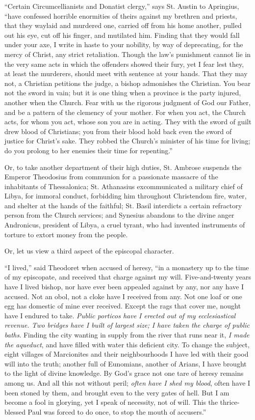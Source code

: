 ``Certain Circumcellianists and Donatist clergy,'' says St.
Austin to Apringius, ``have confessed horrible enormities of
theirs against my brethren and priests, that they waylaid and murdered
one, carried off from his home another, pulled out his eye, cut off
his finger, and mutilated him. Finding that they would fall under your
axe, I write in haste to your nobility, by way of deprecating, for the
mercy of Christ, any strict retaliation.
Though the law's punishment cannot lie in the very same acts in which
the offenders showed their fury, yet I fear lest they, at least the
murderers, should meet with sentence at your hands. That they may not,
a Christian petitions the judge, a bishop admonishes the Christian.
You bear not the sword in vain; but it is one thing when a province is
the party injured, another when the Church. Fear with us the rigorous
judgment of God our Father, and be a pattern of the clemency of your
mother. For when you act, the Church acts, for whom you act, whose son
you are in acting. They with the sword of guilt drew blood of
Christians; you from their blood hold back even the sword of justice
for Christ's sake. They robbed the Church's minister of his time for
living; do you prolong to her enemies their time for repenting.''

Or, to take another department of their high duties, St. Ambrose
suspends the Emperor Theodosius from communion for a passionate
massacre of the inhabitants of Thessalonica; St. Athanasius
excommunicated a military chief of Libya, for immoral conduct,
forbidding him throughout Christendom fire, water, and shelter at the
hands of the faithful; St. Basil interdicts a certain refractory
person from the Church services; and Synesius abandons to the divine
anger Andronicus, president of Libya, a cruel tyrant, who had invented
instruments of torture to extort money from the people.

Or, let us view a third aspect of the episcopal character.

``I lived,'' said Theodoret when accused of heresy,
``in a monastery up to the time of my episcopate, and received
that charge against my will. Five-and-twenty years have I lived
bishop, nor have ever been appealed against by any, nor any have I
accused. Not an obol, not a cloke have I received from any. Not one
loaf or one egg has domestic of mine ever received. Except the rags
that cover me, nought have I endured to take. \emph{Public porticos have
I erected out of my ecclesiastical revenue. Two bridges have I built
of largest size; I have taken the charge of public baths}. Finding
the city wanting in supply from the river that runs near it, \emph{I made
the aqueduct}, and have filled with water this deficient city.
To change the subject, eight villages of
Marcionites and their neighbourhoods I have led with their good will
into the truth; another full of Eunomians, another of Arians, I have
brought to the light of divine knowledge. By God's grace not one tare
of heresy remains among us. And all this not without peril; \emph{often
have I shed my blood}, often have I been stoned by them, and
brought even to the very gates of hell. But I am become a fool in
glorying, yet I speak of necessity, not of will. This the
thrice-blessed Paul was forced to do once, to stop the mouth of
accusers.''

